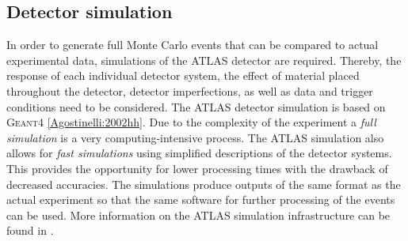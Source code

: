 

\subsection{Detector simulation}
In order to generate full Monte Carlo events that can be compared to actual experimental data, simulations of the ATLAS detector are required.
Thereby, the response of each individual detector system, the effect of material placed throughout the detector, detector imperfections, as well as data and trigger conditions need to be considered. 
The ATLAS detector simulation is based on \textsc{Geant4} \cref{Agostinelli:2002hh}.
Due to the complexity of the experiment a \emph{full simulation} is a very computing-intensive process. The ATLAS simulation also allows for \emph{fast simulations} using simplified descriptions of the detector systems. This provides the opportunity for lower processing times with the drawback of decreased accuracies. 
The simulations produce outputs of the same format as the actual experiment so that the same software for further processing of the events can be used. 
More information on the ATLAS simulation infrastructure can be found in .



